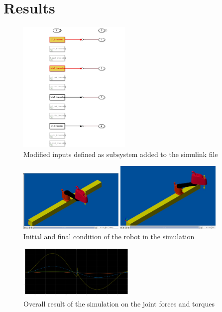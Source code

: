 \documentclass[conference]{IEEEtran}
\begin{document}
\section{Results}
\begin{figure}[htbp]
    \centerline{\includegraphics[width=0.48\textwidth]{figures/subsystem.png}}
    \caption{Modified inputs defined as subsystem added to the simulink file}
    \label{fig:sub}
\end{figure}

\begin{figure}[htbp]
    \centerline{\includegraphics[width=0.45\textwidth]{figures/initial.jpg}}
    \centerline{\includegraphics[width=0.45\textwidth]{figures/final.jpg}}
    \caption{Initial and final condition of the robot in the simulation}
    \label{fig:simulation}
\end{figure}

\begin{figure}[htbp]
    \centerline{\includegraphics[width=0.5\textwidth]{figures/simulinkResult.png}}
    \caption{Overall result of the simulation on the joint forces and torques}
    \label{fig:sim_res}
\end{figure}
\end{document}
